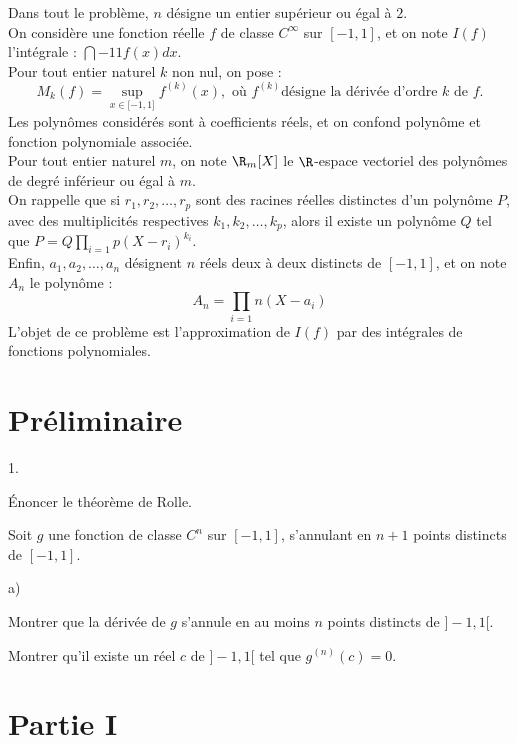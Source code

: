 \documentclass[11pt]{article}%
\begin{document}
\noindent Dans tout le problème, $n$ désigne un entier supérieur ou
égal à $2 $.\\
On considère une fonction réelle $f$ de classe $C^{\infty }$ sur
$[-1,1]$,
et on note $I(f)$ l'intégrale : $\dint{-1}{1}f(x)dx$.\\
Pour tout entier naturel $k$ non nul, on pose :
\[
M_{k}(f) = \sup_{x\in \lbrack -1,1]}f^{(k)}(x),\text{ où }f^{(k)\text{
}}\text{désigne la dérivée d'ordre }k\text{ de }f.
\]
Les polynômes considérés sont à coefficients réels, et on confond
polynôme
et fonction polynomiale associée.\\
Pour tout entier naturel $m$, on note $\R_{m}[X]$ le $\R$-espace
vectoriel des polynômes de degré inférieur ou égal à $m$.\\
On rappelle que si $r_{1},r_{2},\dots,r_{p}$ sont des racines réelles
distinctes d'un polynôme $P$, avec des multiplicités respectives
$k_{1},k_{2},\dots,k_{p}$, alors il existe un polynôme $Q$ tel que $P =
Q\prod\limits_{i = 1}{p}(X-r_{i})^{k_{i}}$.\\
Enfin, $a_{1},a_{2},\dots,a_{n}$ désignent $n$ réels deux à deux
distincts
de $[-1,1]$, et on note $A_{n}$ le polynôme : 
\[
A_{n} = \prod_{i = 1}{n}(X-a_{i})
\]
L'objet de ce problème est l'approximation de $I(f)$ par des intégrales
de
fonctions polynomiales.

\section*{Préliminaire}

\begin{noliste}{1.}
 \setlength{\itemsep}{4mm}
\item Énoncer le théorème de Rolle.

\item Soit $g$ une fonction de classe $C^{n}$ sur $[-1,1]$, s'annulant
en $n + 1$ points distincts de $[-1,1]$.

\begin{noliste}{a)}
 \setlength{\itemsep}{2mm}
\item Montrer que la dérivée de $g$ s'annule en au moins $n$ points
distincts de $]-1,1[$.

\item Montrer qu'il existe un réel $c$ de $]-1,1[$ tel que $g^{(n)}(c)
= 0$.
\end{noliste}
\end{noliste}

\section*{Partie I}
\end{document}
